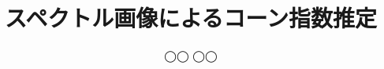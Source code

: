 \documentclass{/workdir/classes/thesis}
\title{スペクトル画像によるコーン指数推定}
\affiliation{東京大学 工学部 精密工学科}
\author{{◯◯ ◯◯}}
\begin{document}
\dominitoc

\maketitle



\frontmatter
\tableofcontents
\listoffigures
\listoftables


\mainmatter










% 

% 

\cleardoublepage
\end{document}

